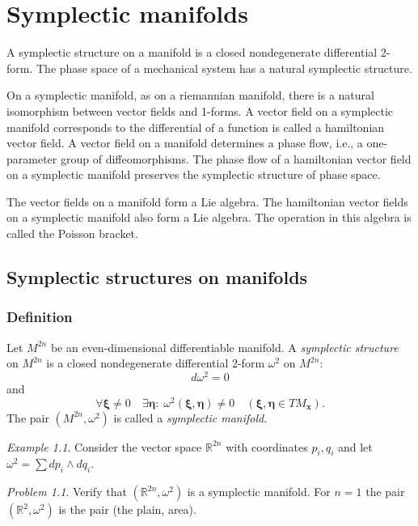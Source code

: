 \documentclass{book}
\numberwithin{equation}{section}
\theoremstyle{plain}
\theoremstyle{definition}
\newtheorem*{defn*}{Definition}
\theoremstyle{remark}
\theoremstyle{remark}
\newtheorem*{ex*}{Example}
\newtheorem*{prob*}{Problem}
\begin{document}
\chapter{Symplectic manifolds}


A symplectic structure on a manifold is a closed nondegenerate differential
2-form.  The phase space of a mechanical system has a natural symplectic
structure.

On a symplectic manifold, as on a riemannian manifold, there is a natural
isomorphism between vector fields and 1-forms.  A vector field on a symplectic
manifold corresponds to the differential of a function is called a
hamiltonian vector field.  A vector field on a manifold determines a phase
flow, i.e., a one-parameter group of diffeomorphisms.  The phase flow of a
hamiltonian vector field on a symplectic manifold preserves the symplectic
structure of phase space.

The vector fields on a manifold form a Lie algebra.  The hamiltonian
vector fields on a symplectic manifold also form a Lie algebra. The operation
in this algebra is called the Poisson bracket.

\section{Symplectic structures on manifolds}

\subsection{Definition}



Let $M^{2n}$ be an even-dimensional differentiable manifold.
A \emph{symplectic structure} on $M^{2n}$ is a closed nondegenerate differential 2-form
$\omega^2$ on $M^{2n}$:
$$
d\omega^2 = 0
$$
and
$$
\forall \pmb \xi \ne 0
\quad
\exists \pmb \eta:
\;
\omega^2(\pmb \xi, \pmb \eta) \ne 0
\quad
(\pmb \xi, \pmb \eta \in TM_{\mathbf x}).
$$
The pair $(M^{2n}, \omega^2)$ is called
a \emph{symplectic manifold}.

\begin{ex*}
  Consider the vector space $\mathbb R^{2n}$
  with coordinates $p_i, q_i$ and let
  $\omega^2 = \sum d p_i \wedge dq_i$.
\end{ex*}

\begin{prob*}
  Verify that $(\mathbb R^{2n}, \omega^2)$
  is a symplectic manifold.
  For $n = 1$ the pair $(\mathbb R^2, \omega^2)$
  is the pair (the plain, area).

\end{prob*}
\end{document}
